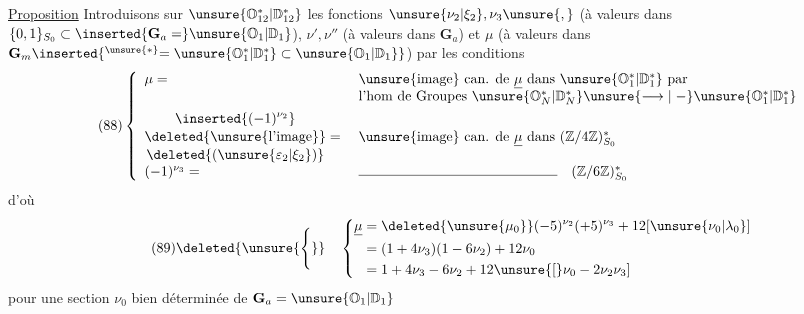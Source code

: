 \uline{Proposition} Introduisons sur  $\unsure{\mathbb O_{12}^*|\mathbb D_{12}^*}$ les fonctions \inserted{$\underline{\mu}\mapsto$} $\unsure{\nu_2|\xi_2},\nu_3\unsure{,}$  (à valeurs dans $\{0,1\}_{S_0}\subset\inserted{\mathbf G_a=}\unsure{\mathbb O_1|\mathbb D_1}$), $\nu',\nu''$  (à valeurs dans $\mathbf G_a$) et $\mu$ (à valeurs dans $\mathbf G_m\inserted{^{\unsure{*}}=\unsure{\mathbb O_1^*|\mathbb D_1^*}\subset\unsure{\mathbb O_1|\mathbb D_1}}$)  par les conditions
\[
\tag{88}
\left\{\begin{array}{ll}
\mu={}&\text{\unsure{image} can. de }\underline{\mu}\text{ dans }\unsure{\mathbb O_1^*|\mathbb D_1^*}\text{ par}\\
&\text{l'hom de Groupes }\unsure{\mathbb O_N^*|\mathbb D_N^*}\unsure{\longrightarrow|\mathrel{-}}\unsure{\mathbb O_1^*|\mathbb D_1^*}\\[4pt]
\begin{gathered}
\inserted{(-1)^{\nu_2}}\\[-2pt]
\deleted{\text{\unsure{l'image}}}\\[-2pt]
\deleted{(\unsure{\varepsilon_2|\xi_2})}
\end{gathered}={}&\text{\unsure{image} can. de }\underline{\mu}\text{ dans }(\mathbb Z/4\mathbb Z)^*_{S_0}\\[4pt]
(-1)^{\nu_3}={}&\rule{5cm}{0.4pt}\quad(\mathbb Z/6\mathbb Z)^*_{S_0}
\end{array}\right.
\]
d'où
\[
\tag{89}
\deleted{\unsure{\Bigg\{}}\quad
\left\{\begin{aligned}
\underline{\mu}&=\deleted{\unsure{\mu_0}}(-5)^{\nu_2}(+5)^{\nu_3}+12[\unsure{\nu_0|\lambda_0}]\\
&=(1+4\nu_3)(1-6\nu_2)+12\nu_0\\
&=1+4\nu_3-6\nu_2+12\unsure{[}\nu_0-2\nu_2\nu_3]
\end{aligned}\right.
\]
pour une section $\nu_0$ bien déterminée de $\mathbf G_a=\unsure{\mathbb O_1|\mathbb D_1}$

